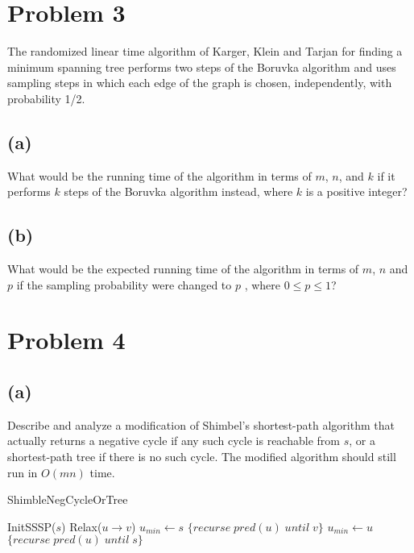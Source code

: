 \documentclass[12pt]{article}
\begin{document}
\section*{Problem 3}
The randomized linear time algorithm of Karger, Klein and Tarjan for
finding a minimum spanning tree performs two steps of the Boruvka
algorithm and uses sampling steps in which each edge of the graph is
chosen, independently, with probability 1/2.

\subsection*{(a)}
What would be the running time of the algorithm in terms of $m$, $n$,
and $k$ if it performs $k$ steps of the Boruvka algorithm instead,
where $k$ is a positive integer?

\subsection*{(b)}
 What would be the expected running time of the algorithm in terms of
 $m$, $n$ and $p$ if the sampling probability were changed to $p$ ,
 where $0 \le p \le 1$?

\pagebreak

\section*{Problem 4}

\subsection*{(a)}
Describe and analyze a modification of Shimbel's shortest-path algorithm
that actually returns a negative cycle if any such cycle is reachable
from $s$, or a shortest-path tree if there is no such cycle. The modified
algorithm should still run in $O(mn)$ time.

\begin{algorithm}
\caption{ShimbleNegCycleOrTree}
\begin{algorithmic}
    \STATE InitSSSP($s$)
                \STATE Relax($u \rightarrow v$)
            \ENDIF
        \ENDFOR
    \ENDFOR
    \STATE $u_{min} \leftarrow s$
            \RETURN $\{ recurse\; pred(u)\; until\; v \}$
        \ENDIF
            \STATE $u_{min} \leftarrow u$
        \ENDIF
        \RETURN $\{ recurse\; pred(u)\; until\; s \}$
    \ENDFOR
\end{algorithmic}
\end{algorithm}
\end{document}

